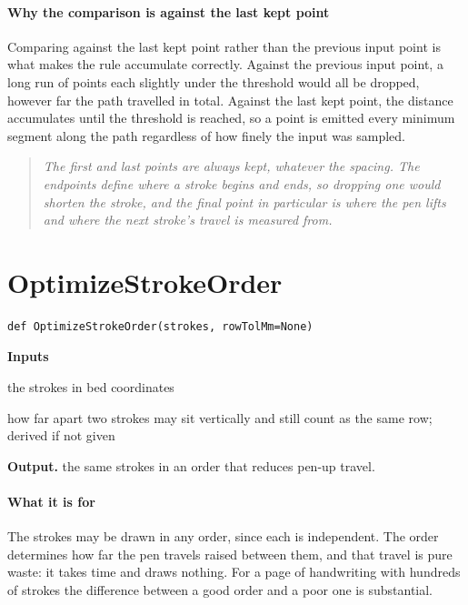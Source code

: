 \paragraph{Why the comparison is against the last kept point}
Comparing against the last kept point rather than the previous input point is what makes the rule accumulate correctly. Against the previous input point, a long run of points each slightly under the threshold would all be dropped, however far the path travelled in total. Against the last kept point, the distance accumulates until the threshold is reached, so a point is emitted every minimum segment along the path regardless of how finely the input was sampled.


\begin{quote}\small\itshape The first and last points are always kept, whatever the spacing. The endpoints define where a stroke begins and ends, so dropping one would shorten the stroke, and the final point in particular is where the pen lifts and where the next stroke's travel is measured from.\end{quote}

\section{OptimizeStrokeOrder}
\begin{lstlisting}[style=sig]
def OptimizeStrokeOrder(strokes, rowTolMm=None)
\end{lstlisting}

\noindent\textbf{Inputs}
\begin{description}[leftmargin=2.2em,style=nextline,font=\normalfont\ttfamily]\setlength\itemsep{1pt}
  \item[{strokes}] \normalfont the strokes in bed coordinates
  \item[{rowTolMm}] \normalfont how far apart two strokes may sit vertically and still count as the same row; derived if not given
\end{description}

\noindent\textbf{Output.} the same strokes in an order that reduces pen-up travel.


\paragraph{What it is for}
The strokes may be drawn in any order, since each is independent. The order determines how far the pen travels raised between them, and that travel is pure waste: it takes time and draws nothing. For a page of handwriting with hundreds of strokes the difference between a good order and a poor one is substantial.


